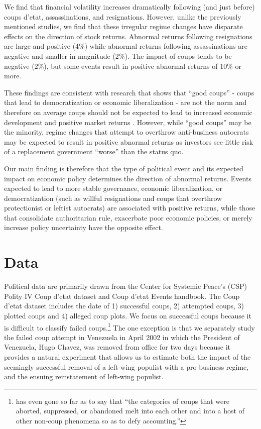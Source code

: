 \documentclass[12pt,final,fleqn]{article}
\theoremstyle{plain}
\begin{document}
We find that financial volatility increases dramatically following (and just before) coups d'etat, assassinations, and resignations. However, unlike the previously mentioned studies, we find that these irregular regime changes have disparate effects on the direction of stock returns. Abnormal returns following resignations are large and positive (4\%) while abnormal returns following assassinations are negative and smaller in magnitude (2\%). The impact of coups tends to be negative (2\%), but some events result in positive abnormal returns of 10\% or more. 

These findings are consistent with research that shows that ``good coups'' - coups that lead to democratization or economic liberalization - are not the norm and therefore on average coups should not be expected to lead to increased economic development and positive market returns \citep{derpanopoulos2015coups, marinov2014coups, powell2011global, thyne2016coup, varol2011democratic}. However, while ``good coups'' may be the minority, regime changes that attempt to overthrow anti-business autocrats may be expected to result in positive abnormal returns as investors see little risk of a replacement government ``worse'' than the status quo.

Our main finding is therefore that the type of political event and its expected impact on economic policy determines the direction of abnormal returns. Events expected to lead to more stable governance, economic liberalization, or democratization (such as willful resignations and coups that overthrow protectionist or leftist autocrats) are associated with positive returns, while those that consolidate authoritarian rule, exacerbate poor economic policies, or merely increase policy uncertainty have the opposite effect.

\section{Data}
Political data are primarily drawn from the Center for Systemic Peace's (CSP) Polity IV Coup d'etat dataset and Coup d'etat Events handbook. The Coup d'etat dataset includes the date of 1) successful coups, 2) attempted coups, 3) plotted coups and 4) alleged coup plots. We focus on successful coups because it is difficult to classify failed coups.\footnote{\citet[p. 617]{needler1966political} has even gone so far as to say that ``the categories of coups that were aborted, suppressed, or abandoned melt into each other and into a host of other non-coup phenomena so as to defy accounting.''} The one exception is that we separately study the failed coup attempt in Venezuela in April 2002 in which the President of Venezuela, Hugo Chavez, was removed from office for two days because it provides a natural experiment that allows us to estimate both the impact of the seemingly successful removal of a left-wing populist with a pro-business regime, and the ensuing reinstatement of left-wing populist. 
\end{document}
